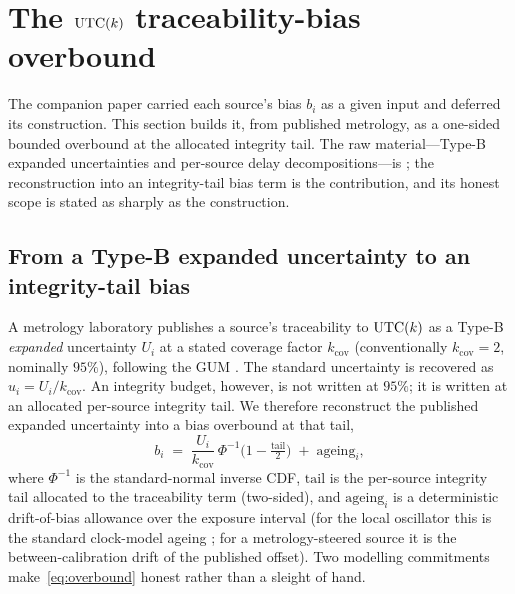 \section{The $\mathrm{UTC}(k){}$ traceability-bias overbound}
\label{sec:trace}

The companion paper carried each source's bias $b_i$ as a given input and deferred
its construction. This section builds it, from published metrology, as a one-sided
bounded overbound at the allocated integrity tail. The raw material---Type-B
expanded uncertainties and per-source delay decompositions---is \Cited{}; the
reconstruction into an integrity-tail bias term is the \Proven{} contribution, and
its honest scope is stated as sharply as the construction.

\subsection{From a Type-B expanded uncertainty to an integrity-tail bias}
\label{sec:overbound}

A metrology laboratory publishes a source's traceability to $\mathrm{UTC}(k){}$ as a Type-B
\emph{expanded} uncertainty $U_i$ at a stated coverage factor $k_{\mathrm{cov}}$
(conventionally $k_{\mathrm{cov}}=2$, nominally $95\%$), following the GUM
\citep{jcgm100}. The standard uncertainty is recovered as
$u_i=U_i/k_{\mathrm{cov}}$. An integrity budget, however, is not written at $95\%$;
it is written at an allocated per-source integrity tail. We therefore reconstruct
the published expanded uncertainty into a bias overbound at that tail,
\begin{equation}
  b_i \;=\; \frac{U_i}{k_{\mathrm{cov}}}\,
            \Phi^{-1}\!\Big(1-\tfrac{\mathrm{tail}}{2}\Big)
            \;+\; \mathrm{ageing}_i,
  \label{eq:overbound}
\end{equation}
where $\Phi^{-1}$ is the standard-normal inverse CDF, $\mathrm{tail}$ is the
per-source integrity tail allocated to the traceability term (two-sided), and
$\mathrm{ageing}_i$ is a deterministic drift-of-bias allowance over the exposure
interval (for the local oscillator this is the standard clock-model ageing
\citep{zucca2005}; for a metrology-steered source it is the between-calibration
drift of the published offset). Two modelling commitments make~\eqref{eq:overbound}
honest rather than a sleight of hand.

